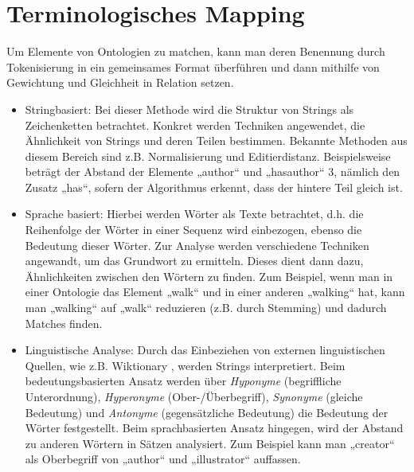 	\section{Terminologisches Mapping}
	Um Elemente von Ontologien zu matchen, kann man deren Benennung durch Tokenisierung in ein gemeinsames Format überführen und dann mithilfe von Gewichtung und Gleichheit in Relation setzen.
	\begin{itemize}
		\item Stringbasiert: Bei dieser Methode wird die Struktur von Strings als
		Zeichenketten betrachtet. Konkret werden Techniken angewendet, die Ähnlichkeit von Strings und deren Teilen bestimmen. Bekannte Methoden aus diesem Bereich sind z.B. Normalisierung und Editierdistanz. \cite{Euz07}  Beispielsweise beträgt der Abstand der Elemente „author“ und „hasauthor“ 3, nämlich den Zusatz „has“, sofern der Algorithmus erkennt, dass der hintere Teil gleich ist.
		\item  Sprache basiert: Hierbei werden Wörter als Texte betrachtet, d.h. die
		Reihenfolge der Wörter in einer Sequenz wird einbezogen, ebenso die Bedeutung dieser Wörter. Zur Analyse werden verschiedene Techniken angewandt, um das Grundwort zu ermitteln. Dieses dient dann dazu, Ähnlichkeiten zwischen den Wörtern zu finden. \cite{Euz07}  Zum Beispiel, wenn man in einer Ontologie das Element „walk“ und in einer anderen „walking“ hat, kann man „walking“ auf „walk“ reduzieren (z.B. durch Stemming) und dadurch Matches finden.
		\item Linguistische Analyse: Durch das Einbeziehen von externen
		linguistischen Quellen, wie z.B. Wiktionary , werden Strings interpretiert.
		Beim bedeutungsbasierten Ansatz werden über \textit{Hyponyme} (begriffliche
		Unterordnung), \textit{Hyperonyme} (Ober-/Überbegriff), \textit{Synonyme}
		(gleiche Bedeutung) und \textit{Antonyme} (gegensätzliche Bedeutung) die
		Bedeutung der Wörter festgestellt. Beim sprachbasierten Ansatz hingegen, wird der Abstand zu anderen Wörtern in Sätzen analysiert. \cite{Euz07} Zum Beispiel kann man „creator“ als Oberbegriff von „author“ und „illustrator“ auffassen.
	\end{itemize}
	
